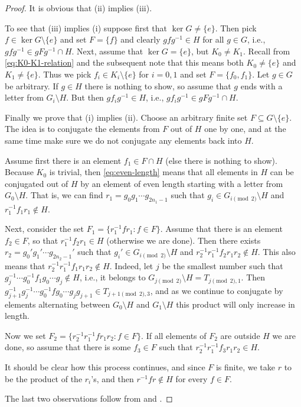 \documentclass[a4paper]{amsart}
\theoremstyle{plain}
\theoremstyle{definition}
\theoremstyle{remark}
\numberwithin{theorem}{section}
\begin{document}
\begin{proof}
It is obvious that (ii) implies (iii).

To see that (iii) implies (i) suppose first that $\ker G\neq \{e\}$.
Then pick $f\in\ker G\setminus\{e\}$ and set $F=\{f\}$ and clearly $gfg^{-1}\in H$ for all $g\in G$,
i.e., $gfg^{-1}\in gFg^{-1}\cap H$.
Next, assume that $\ker G=\{e\}$, but $K_0\neq K_1$.
Recall from \eqref{eq:K0-K1-relation} and the subsequent note that this means both $K_0\neq\{e\}$ and $K_1\neq\{e\}$.
Thus we pick $f_i\in K_i\setminus\{e\}$ for $i=0,1$ and set $F=\{f_0,f_1\}$.
Let $g\in G$ be arbitrary.
If $g\in H$ there is nothing to show, so assume that $g$ ends with a letter from $G_i\setminus H$.
But then $gf_ig^{-1}\in H$, i.e., $gf_ig^{-1}\in gFg^{-1}\cap H$.

Finally we prove that (i) implies (ii).
Choose an arbitrary finite set $F\subseteq G\setminus\{e\}$.
The idea is to conjugate the elements from $F$ out of $H$ one by one,
and at the same time make sure we do not conjugate any elements back into $H$.

Assume first there is an element $f_1\in F \cap H$ (else there is nothing to show).
Because $K_0$ is trivial, then \eqref{eq:even-length} means that all elements in $H$
can be conjugated out of $H$ by an element of even length starting with a letter from $G_0\setminus H$.
That is, we can find $r_1=g_0g_1\dotsm g_{2n_1-1}$ such that $g_i\in G_{i\pmod 2}\setminus H$ and $r_1^{-1}f_1r_1\notin H$.

Next, consider the set $F_1=\{r_1^{-1}fr_1 : f\in F\}$.
Assume that there is an element $f_2\in F$, so that $r_1^{-1}f_2r_1\in H$ (otherwise we are done).
Then there exists $r_2=g_0'g_1'\dotsm g_{2n_2-1}'$ such that $g_i'\in G_{i\pmod 2}\setminus H$ and $r_2^{-1}r_1^{-1}f_2r_1r_2\notin H$.
This also means that $r_2^{-1}r_1^{-1}f_1r_1r_2\notin H$.
Indeed, let $j$ be the smallest number such that $g_j^{-1}\dotsm g_0^{-1}f_1g_0\dotsm g_j\notin H$, i.e.,
it belongs to $G_{j\pmod 2}\setminus H=T_{j\pmod 2,1}$.
Then $g_{j+1}^{-1}g_j^{-1}\dotsm g_0^{-1}fg_0\dotsm g_jg_{j+1}\in T_{j+1\pmod 2,3}$,
and as we continue to conjugate by elements alternating between $G_0\setminus H$ and $G_1\setminus H$ this product will only increase in length.

Now we set $F_2=\{r_2^{-1}r_1^{-1}fr_1r_2 : f\in F\}$.
If all elements of $F_2$ are outside $H$ we are done, so assume that there is some $f_3\in F$ such that $r_2^{-1}r_1^{-1}f_3r_1r_2\in H$.

It should be clear how this process continues,
and since $F$ is finite, we take $r$ to be the product of the $r_i$'s,
and then $r^{-1}fr\notin H$ for every $f\in F$.

The last two observations follow from \cite[Proposition~10]{Harpe} and \cite[Example~4.4~(iii),(iv), and Remark~4.5]{DH}.
\end{proof}
\end{document}
